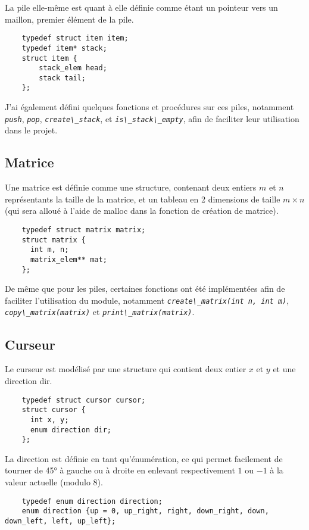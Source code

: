 \documentclass[a4paper,11pt]{article}
\newcommand{\code}[1]{{\textit{\lstinline{#1}}}}
\begin{document}
La pile elle-même est quant à elle définie comme étant un pointeur vers un maillon, premier élément de la pile.

\begin{lstlisting}
    typedef struct item item;
    typedef item* stack;
    struct item {
        stack_elem head;
        stack tail;
    };
\end{lstlisting}

J'ai également défini quelques fonctions et procédures sur ces piles, notamment \code{push}, \code{pop}, \code{create\_stack}, et \code{is\_stack\_empty}, afin de faciliter leur utilisation dans le projet.

\subsection*{Matrice}
Une matrice est définie comme une structure, contenant deux entiers $m$ et $n$ représentants la taille de la matrice, et un tableau en 2 dimensions de taille $m \times n$ (qui sera alloué à l'aide de malloc dans la fonction de création de matrice).

\begin{lstlisting}
    typedef struct matrix matrix;
    struct matrix {
      int m, n;
      matrix_elem** mat;
    };
\end{lstlisting}

De même que pour les piles, certaines fonctions ont été implémentées afin de faciliter l'utilisation du module, notamment \code{create\_matrix(int n, int m)}, \code{copy\_matrix(matrix)} et \code{print\_matrix(matrix)}.

\subsection*{Curseur}
Le curseur est modélisé par une structure qui contient deux entier $x$ et $y$ et une direction dir.
\begin{lstlisting}
    typedef struct cursor cursor;
    struct cursor {
      int x, y;
      enum direction dir;
    };
\end{lstlisting}

La direction est définie en tant qu'énumération, ce qui permet facilement de tourner de 45° à gauche ou à droite en enlevant respectivement $1$ ou $-1$ à la valeur actuelle (modulo 8).
\begin{lstlisting}
    typedef enum direction direction;
    enum direction {up = 0, up_right, right, down_right, down, down_left, left, up_left};
\end{lstlisting}
\end{document}
